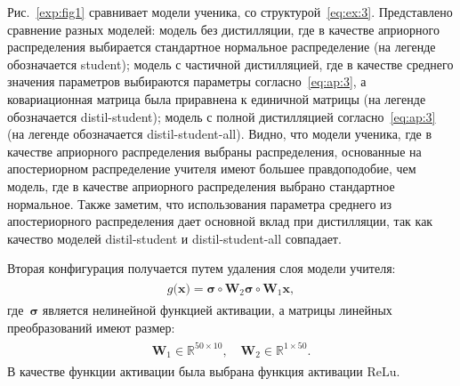 \documentclass[12pt]{a&t}
\begin{document}
Рис.~\ref{exp:fig1} сравнивает модели ученика, со структурой~\eqref{eq:ex:3}. Представлено сравнение разных моделей: модель без дистилляции, где в качестве априорного распределения выбирается стандартное нормальное распределение (на легенде обозначается student); модель с частичной дистилляцией, где в качестве среднего значения параметров выбираются параметры согласно~\eqref{eq:ap:3}, а ковариационная матрица была приравнена к единичной матрицы (на легенде обозначается distil-student); модель с полной дистилляцией согласно~\eqref{eq:ap:3} (на легенде обозначается distil-student-all). Видно, что модели ученика, где в качестве априорного распределения выбраны распределения, основанные на апостериорном распределение учителя имеют большее правдоподобие, чем модель, где в качестве априорного распределения выбрано стандартное нормальное. Также заметим, что использования параметра среднего из апостериорного распределения дает основной вклад при дистилляции, так как качество моделей distil-student и distil-student-all совпадает.

Вторая конфигурация получается путем удаления слоя модели учителя:
\begin{gather}
\label{eq:ex:5}
\begin{aligned}
g\bigr(\mathbf{x}\bigr) = \bm{\sigma} \circ \mathbf{W}_2\bm{\sigma} \circ \mathbf{W}_1\mathbf{x},
\end{aligned}
\end{gather}
где~$\bm{\sigma}$ является нелинейной функцией активации, а матрицы линейных преобразований имеют размер:
\begin{gather}
\label{eq:ex:6}
\begin{aligned}
\mathbf{W}_{1} \in \mathbb{R}^{50 \times 10}, \quad \mathbf{W}_{2} \in \mathbb{R}^{1 \times 50}.
\end{aligned}
\end{gather}
 В качестве функции активации была выбрана функция активации $\text{ReLu}$.
\end{document}
